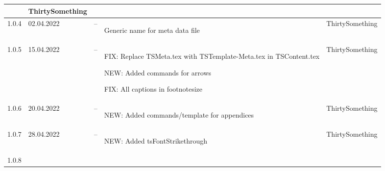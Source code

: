 \begin{tiny}
\begin{longtable}{ | p{} | p{} | p{} | P{0.49\textwidth} | p{0.15\textwidth} | }
                                 &
        ThirtySomething            \\
        \hline
        1.0.4                    &
        02.04.2022               &
        --                       &
        \begin{tsLTItemize}
            \item Generic name for meta data file
        \end{tsLTItemize}
                                 &
        ThirtySomething            \\
        \hline
        1.0.5                    &
        15.04.2022               &
        --                       &
        \begin{tsLTItemize}
            \item FIX: Replace TSMeta.tex with TSTemplate-Meta.tex in TSContent.tex
            \item NEW: Added commands for arrows
            \item FIX: All captions in footnotesize
        \end{tsLTItemize}
                                 &
        ThirtySomething            \\
        \hline
        1.0.6                    &
        20.04.2022               &
        --                       &
        \begin{tsLTItemize}
            \item NEW: Added commands/template for appendices
        \end{tsLTItemize}
                                 &
        ThirtySomething            \\
        \hline
        1.0.7                    &
        28.04.2022               &
        --                       &
        \begin{tsLTItemize}
            \item NEW: Added tsFontStrikethrough
        \end{tsLTItemize}
                                 &
        ThirtySomething            \\
        \hline
        1.0.8                    &

\end{longtable}
\end{tiny}
